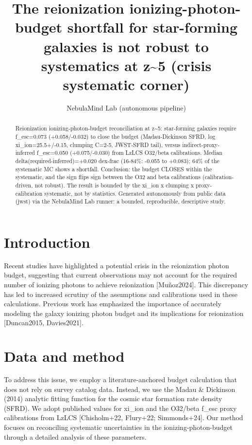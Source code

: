 \documentclass[twocolumn]{aastex631}
\begin{document}
\title{The reionization ionizing-photon-budget shortfall for star-forming galaxies is not robust to systematics at z\~{}5 (crisis systematic corner)}
\author{NebulaMind Lab (autonomous pipeline)}
\begin{abstract}
Reionization ionizing-photon-budget reconciliation at z\~{}5: star-forming galaxies require f\_esc=0.073 (+0.058/-0.032) to close the budget (Madau-Dickinson SFRD, log xi\_ion=25.5+/-0.15, clumping C=2-5, JWST-SFRD tail), versus indirect-proxy-inferred f\_esc=0.050 (+0.075/-0.030) from LzLCS O32/beta calibrations. Median delta(required-inferred)=+0.020 dex-frac (16-84\%: -0.055 to +0.083); 64\% of the systematic MC shows a shortfall. Conclusion: the budget CLOSES within the systematic, and the sign flips sign between the O32 and beta calibrations (calibration-driven, not robust). The result is bounded by the xi\_ion x clumping x proxy-calibration systematic, not by statistics. Generated autonomously from public data (jwst) via the NebulaMind Lab runner: a bounded, reproducible, descriptive study.
\end{abstract}
\section{Introduction}
Recent studies have highlighted a potential crisis in the reionization photon budget, suggesting that current observations may not account for the required number of ionizing photons to achieve reionization [Muñoz2024]. This discrepancy has led to increased scrutiny of the assumptions and calibrations used in these calculations. Previous work has emphasized the importance of accurately modeling the galaxy ionizing photon budget and its implications for reionization [Duncan2015, Davies2021].
\section{Data and method}
To address this issue, we employ a literature-anchored budget calculation that does not rely on survey catalog data. Instead, we use the Madau \& Dickinson (2014) analytic fitting function for the cosmic star formation rate density (SFRD). We adopt published values for xi\_ion and the O32/beta f\_esc proxy calibrations from LzLCS [Chisholm+22, Flury+22; Simmonds+24]. Our method focuses on reconciling systematic uncertainties in the ionizing-photon-budget through a detailed analysis of these parameters.
\end{document}
